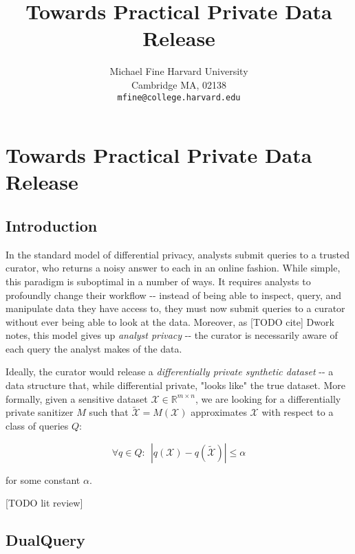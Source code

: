 \documentclass{article}
\title{Towards Practical Private Data Release}
\author{%
  Michael Fine
  Harvard University\\
  Cambridge MA, 02138 \\
  \texttt{mfine@college.harvard.edu} 
}
\begin{document}
\maketitle


\section{Towards Practical Private Data Release}

\subsection{Introduction}

In the standard model of differential privacy, analysts submit queries
to a trusted curator, who returns a noisy answer to each in an online
fashion. While simple, this paradigm is suboptimal in a number of ways.
It requires analysts to profoundly change their workflow -\/- instead of
being able to inspect, query, and manipulate data they have access to,
they must now submit queries to a curator without ever being able to
look at the data. Moreover, as {[}TODO cite{]} Dwork notes, this model
gives up \emph{analyst privacy} -\/- the curator is necessarily aware of
each query the analyst makes of the data.

Ideally, the curator would release a \emph{differentially private
synthetic dataset} -\/- a data structure that, while differential
private, "looks like" the true dataset. More formally, given a sensitive
dataset \(\mathcal{X} \in \mathbb{R}^{m\times n}\), we are looking for a
differentially private sanitizer \(M\) such that
\(\tilde{\mathcal{X}} = M(\mathcal{X}) \) approximates \(\mathcal{X}\)
with respect to a class of queries \(Q\):

\[\forall q \in Q : ~~ |q(\mathcal{X}) - q(\tilde{\mathcal{X}})| \leq \alpha\]

for some constant \(\alpha\).

{[}TODO lit review{]}

\subsection{DualQuery }
\end{document}
